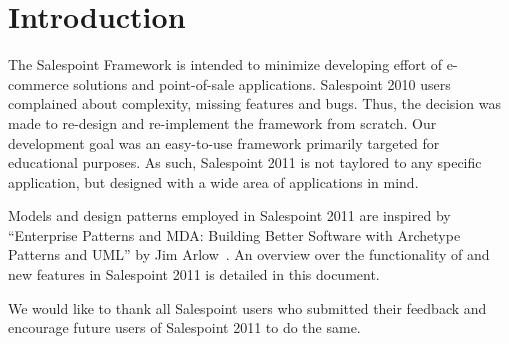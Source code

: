 \chapter{Introduction}
The Salespoint Framework is intended to minimize developing effort of e-commerce solutions and point-of-sale applications.
Salespoint 2010 users complained about complexity, missing features and bugs.
Thus, the decision was made to re-design and re-implement the framework from scratch.
Our development goal was an easy-to-use framework primarily targeted for educational purposes.
As such, Salespoint 2011 is not taylored to any specific application, but designed with a wide area of applications in mind.

Models and design patterns employed in Salespoint 2011 are inspired by ``Enterprise Patterns and MDA: Building Better Software with Archetype Patterns and UML'' by Jim Arlow~\cite{MDA}.
An overview over the functionality of and new features in Salespoint 2011 is detailed in this document.

We would like to thank all Salespoint users who submitted their feedback and encourage future users of Salespoint 2011 to do the same.
